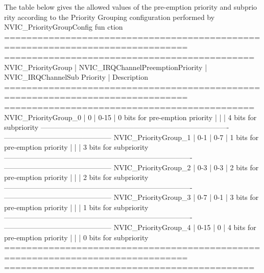 \begin{DoxyCode}
 The table below gives the allowed values of the pre-emption priority and subprio
      rity according
 to the Priority Grouping configuration performed by NVIC_PriorityGroupConfig fun
      ction
  ===============================================================================
      =============================================
    NVIC_PriorityGroup   | NVIC_IRQChannelPreemptionPriority | NVIC_IRQChannelSub
      Priority  | Description
  ===============================================================================
      =============================================
   NVIC_PriorityGroup_0  |                0                  |            0-15   
                |   0 bits for pre-emption priority
                         |                                   |                   
                |   4 bits for subpriority
  -------------------------------------------------------------------------------
      ---------------------------------------------
   NVIC_PriorityGroup_1  |                0-1                |            0-7    
                |   1 bits for pre-emption priority
                         |                                   |                   
                |   3 bits for subpriority
  -------------------------------------------------------------------------------
      ---------------------------------------------    
   NVIC_PriorityGroup_2  |                0-3                |            0-3    
                |   2 bits for pre-emption priority
                         |                                   |                   
                |   2 bits for subpriority
  -------------------------------------------------------------------------------
      ---------------------------------------------    
   NVIC_PriorityGroup_3  |                0-7                |            0-1    
                |   3 bits for pre-emption priority
                         |                                   |                   
                |   1 bits for subpriority
  -------------------------------------------------------------------------------
      ---------------------------------------------    
   NVIC_PriorityGroup_4  |                0-15               |            0      
                |   4 bits for pre-emption priority
                         |                                   |                   
                |   0 bits for subpriority                       
  ===============================================================================
      =============================================
\end{DoxyCode}
 